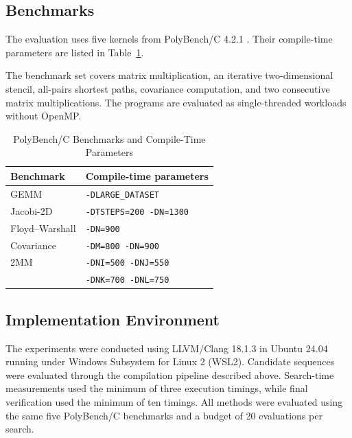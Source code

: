 \subsection{Benchmarks}
The evaluation uses five kernels from PolyBench/C 4.2.1 \cite{pouchet2016polybench}. Their compile-time parameters are listed in Table~\ref{tab:bench}.

The benchmark set covers matrix multiplication, an iterative two-dimensional stencil, all-pairs shortest paths, covariance computation, and two consecutive matrix multiplications. The programs are evaluated as single-threaded workloads without OpenMP.

\begin{table}[t]
\caption{PolyBench/C Benchmarks and Compile-Time Parameters}
\label{tab:bench}
\centering\small
\begin{tabular}{@{}ll@{}}
\toprule
Benchmark & Compile-time parameters\\
\midrule
GEMM & \texttt{-DLARGE\_DATASET}\\
Jacobi-2D & \texttt{-DTSTEPS=200 -DN=1300}\\
Floyd--Warshall & \texttt{-DN=900}\\
Covariance & \texttt{-DM=800 -DN=900}\\
2MM & \texttt{-DNI=500 -DNJ=550}\\
 & \texttt{-DNK=700 -DNL=750}\\
\bottomrule
\end{tabular}
\end{table}

\subsection{Implementation Environment}
The experiments were conducted using LLVM/Clang 18.1.3 in Ubuntu 24.04 running under Windows Subsystem for Linux 2 (WSL2). Candidate sequences were evaluated through the compilation pipeline described above. Search-time measurements used the minimum of three execution timings, while final verification used the minimum of ten timings. All methods were evaluated using the same five PolyBench/C benchmarks and a budget of 20 evaluations per search.

